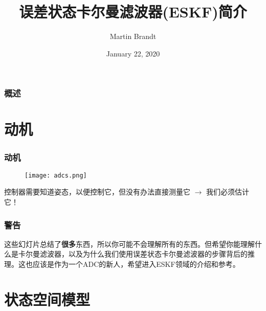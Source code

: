 \documentclass{beamer}
\title[ESKF 简介]{误差状态卡尔曼滤波器(ESKF)简介} %
\author{Martin Brandt} %
\date{January 22, 2020} %
\begin{document}
\begin{frame}
\titlepage %
\end{frame}

\begin{frame}
\frametitle{概述} %
\tableofcontents %
\end{frame}

\section{动机}

\begin{frame}
    \frametitle{动机}
    \begin{figure}
    \texttt{[image: adcs.png]}
    \end{figure}
    控制器需要知道姿态，以便控制它，但没有办法直接测量它 $\rightarrow$ 我们必须估计它！
\end{frame}


\begin{frame}
    \frametitle{警告}
    这些幻灯片总结了\textbf{很多}东西，所以你可能不会理解所有的东西。但希望你能理解什么是卡尔曼滤波器，以及为什么我们使用误差状态卡尔曼滤波器的步骤背后的推理。这也应该是作为一个ADC的新人，希望进入ESKF领域的介绍和参考。 
\end{frame}


\section{状态空间模型}
\end{document}
